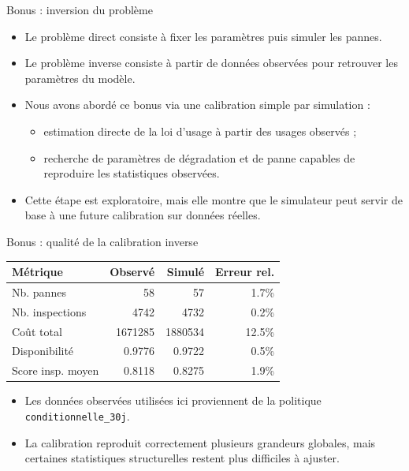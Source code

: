 \documentclass[aspectratio=169]{beamer}
\begin{document}
\begin{frame}{Bonus : inversion du problème}
\begin{itemize}
  \item Le problème direct consiste à fixer les paramètres puis simuler les pannes.
  \item Le problème inverse consiste à partir de données observées pour retrouver les paramètres du modèle.
  \item Nous avons abordé ce bonus via une calibration simple par simulation :
  \begin{itemize}
    \item estimation directe de la loi d'usage à partir des usages observés ;
    \item recherche de paramètres de dégradation et de panne capables de reproduire les statistiques observées.
  \end{itemize}
  \item Cette étape est exploratoire, mais elle montre que le simulateur peut servir de base à une future calibration sur données réelles.
\end{itemize}
\end{frame}

\begin{frame}{Bonus : qualité de la calibration inverse}
\small
\centering
\begin{tabular}{lrrr}
\toprule
\textbf{Métrique} & \textbf{Observé} & \textbf{Simulé} & \textbf{Erreur rel.} \\
\midrule
Nb. pannes & 58 & 57 & 1.7\% \\
Nb. inspections & 4742 & 4732 & 0.2\% \\
Coût total & 1671285 & 1880534 & 12.5\% \\
Disponibilité & 0.9776 & 0.9722 & 0.5\% \\
Score insp. moyen & 0.8118 & 0.8275 & 1.9\% \\
\bottomrule
\end{tabular}

\vspace{0.3cm}
\begin{itemize}
  \item Les données observées utilisées ici proviennent de la politique \texttt{conditionnelle\_30j}.
  \item La calibration reproduit correctement plusieurs grandeurs globales, mais certaines statistiques structurelles restent plus difficiles à ajuster.
\end{itemize}
\end{frame}
\end{document}

